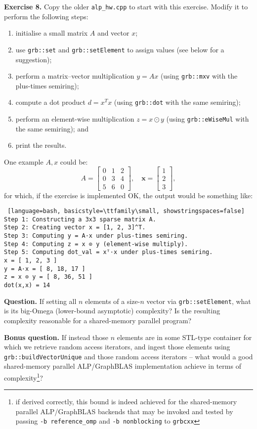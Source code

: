 \noindent \textbf{Exercise 8.} Copy the older \texttt{alp\_hw.cpp} to start with this exercise. Modify it to perform the following steps:
\begin{enumerate}
\item initialise a small matrix $A$ and vector $x$;
\item use \texttt{grb::set} and \texttt{grb::setElement} to assign values (see below for a suggestion);
\item perform a matrix--vector multiplication $y = Ax$ (using \texttt{grb::mxv} with the plus-times semiring);
\item compute a dot product $d = x^Tx$ (using \texttt{grb::dot} with the same semiring);
\item perform an element-wise multiplication $z = x \odot y$ (using \texttt{grb::eWiseMul} with the same semiring); and
\item print the results.
\end{enumerate}
One example $A, x$ could be:
\[
A = 
\begin{bmatrix}
0 & 1 & 2 \\
0 & 3 & 4 \\
5 & 6 & 0
\end{bmatrix},\quad
\mathbf{x} = \begin{bmatrix}1\\2\\3\end{bmatrix},
\]
for which, if the exercise is implemented OK, the output would be something like:
\begin{lstlisting} [language=bash, basicstyle=\ttfamily\small, showstringspaces=false]
Step 1: Constructing a 3x3 sparse matrix A.
Step 2: Creating vector x = [1, 2, 3]^T.
Step 3: Computing y = A·x under plus‐times semiring.
Step 4: Computing z = x ⊙ y (element‐wise multiply).
Step 5: Computing dot_val = xᵀ·x under plus‐times semiring.
x = [ 1, 2, 3 ]
y = A·x = [ 8, 18, 17 ]
z = x ⊙ y = [ 8, 36, 51 ]
dot(x,x) = 14
\end{lstlisting}

\noindent \textbf{Question.} If setting all $n$ elements of a size-$n$ vector via \texttt{grb::setElement}, what is its big-Omega (lower-bound asymptotic) complexity? Is the resulting complexity reasonable for a shared-memory parallel program?

\noindent \textbf{Bonus question.} If instead those $n$ elements are in some STL-type container for which we retrieve random access iterators, and ingest those elements using \texttt{grb::buildVectorUnique} and those random access iterators -- what would a good shared-memory parallel ALP/GraphBLAS implementation achieve in terms of complexity\footnote{if derived correctly, this bound is indeed achieved for the shared-memory parallel ALP/GraphBLAS backends that may be invoked and tested by passing \texttt{-b reference\_omp} and \texttt{-b nonblocking} to \texttt{grbcxx}}?

